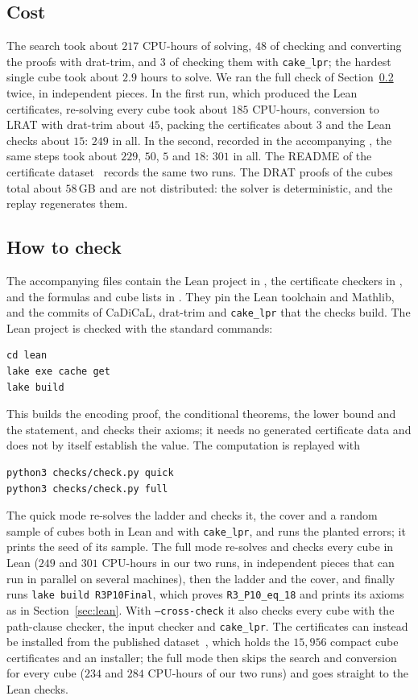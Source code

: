 \subsection{Cost}
The search took about $217$ CPU-hours of solving, $48$ of checking and
converting the proofs with drat-trim, and $3$ of checking them with
\texttt{cake\_lpr}; the hardest single cube took about
$2.9$ hours to solve. We ran the full check of
Section~\ref{sec:commands} twice, in independent pieces. In the first run,
which produced the Lean certificates, re-solving every cube took about
$185$ CPU-hours, conversion to LRAT with drat-trim about $45$, packing the
certificates about $3$ and the Lean checks about $15$: $249$ in all. In
the second, recorded in the accompanying , the same
steps took about $229$, $50$, $5$ and $18$: $301$ in all. The README of the
certificate dataset~\cite{Gra26} records the same two runs. The DRAT
proofs of the cubes total about $58$\,GB and are not distributed: the
solver is deterministic, and the replay regenerates them.

\subsection{How to check}\label{sec:commands}
The accompanying files contain the Lean project in , the
certificate checkers in , and the formulas and cube lists in
. They pin the Lean toolchain and Mathlib, and the commits of
CaDiCaL, drat-trim and \texttt{cake\_lpr} that the checks build. The Lean
project is checked with the standard commands:
\begin{Verbatim}
cd lean
lake exe cache get
lake build
\end{Verbatim}
This builds the encoding proof, the conditional theorems, the lower bound
and the statement, and checks their axioms; it needs no generated
certificate data and does not by itself establish the value. The
computation is replayed with
\begin{Verbatim}
python3 checks/check.py quick
python3 checks/check.py full
\end{Verbatim}
The quick mode re-solves the ladder and checks it, the cover and a random
sample of cubes both in Lean and with \texttt{cake\_lpr}, and runs the
planted errors; it prints the seed of its sample. The full mode re-solves
and checks every cube in Lean ($249$ and $301$ CPU-hours in our two runs, in independent
pieces that can run in parallel on several machines), then the ladder and
the cover, and finally runs \texttt{lake build R3P10Final}, which proves
\texttt{R3\_P10\_eq\_18} and prints its axioms as in
Section~\ref{sec:lean}. With \texttt{--cross-check} it also checks every
cube with the path-clause checker, the input checker and
\texttt{cake\_lpr}. The certificates can instead be installed from the
published dataset~\cite{Gra26}, which holds the $15{,}956$ compact cube
certificates and an installer; the full mode then skips the search and
conversion for every cube ($234$ and $284$ CPU-hours of our two runs) and
goes straight to the Lean checks.


